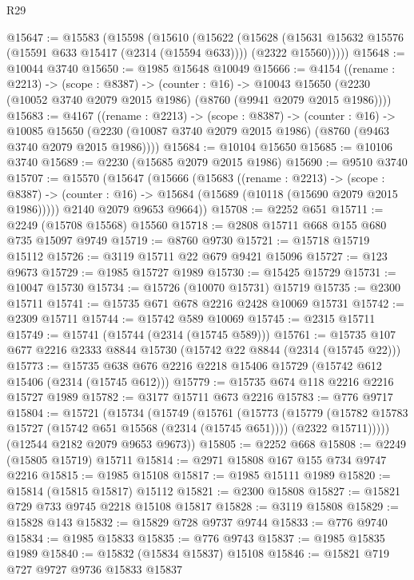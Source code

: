 \begin{lexlean}{R29}
\begin{coremodule}
@15647 := @15583
    (@15598
      (@15610
        (@15622
          (@15628
            (@15631 @15632 @15576 (@15591 @633 @15417 (@2314 (@15594 @633))))
            (@2322 @15560)))))
@15648 := @10044 @3740
@15650 := @1985 @15648 @10049
@15666 := @4154
    ((rename : @2213) ->
    (scope : @8387) ->
    (counter : @16) ->
    @10043 @15650 (@2230 (@10052 @3740 @2079 @2015 @1986) (@8760 (@9941 @2079 @2015 @1986))))
@15683 := @4167
    ((rename : @2213) ->
    (scope : @8387) ->
    (counter : @16) ->
    @10085 @15650 (@2230 (@10087 @3740 @2079 @2015 @1986) (@8760 (@9463 @3740 @2079 @2015 @1986))))
@15684 := @10104 @15650
@15685 := @10106 @3740
@15689 := @2230 (@15685 @2079 @2015 @1986)
@15690 := @9510 @3740
@15707 := @15570
    (@15647
      (@15666
        (@15683
          ((rename : @2213) ->
          (scope : @8387) ->
          (counter : @16) -> @15684 (@15689 (@10118 (@15690 @2079 @2015 @1986)))))
        @2140
        @2079
        @9653
        @9664))
@15708 := @2252 @651
@15711 := @2249 (@15708 @15568) @15560
@15718 := @2808 @15711 @668 @155 @680 @735 @15097 @9749
@15719 := @8760 @9730
@15721 := @15718 @15719 @15112
@15726 := @3119 @15711 @22 @679 @9421 @15096
@15727 := @123 @9673
@15729 := @1985 @15727 @1989
@15730 := @15425 @15729
@15731 := @10047 @15730
@15734 := @15726 (@10070 @15731) @15719
@15735 := @2300 @15711
@15741 := @15735 @671 @678 @2216 @2428 @10069 @15731
@15742 := @2309 @15711
@15744 := @15742 @589 @10069
@15745 := @2315 @15711
@15749 := @15741 (@15744 (@2314 (@15745 @589)))
@15761 := @15735 @107 @677 @2216 @2333 @8844 @15730 (@15742 @22 @8844 (@2314 (@15745 @22)))
@15773 := @15735 @638 @676 @2216 @2218 @15406 @15729 (@15742 @612 @15406 (@2314 (@15745 @612)))
@15779 := @15735 @674 @118 @2216 @2216 @15727 @1989
@15782 := @3177 @15711 @673 @2216
@15783 := @776 @9717
@15804 := @15721
    (@15734
      (@15749
        (@15761
          (@15773
            (@15779
              (@15782 @15783 @15727 (@15742 @651 @15568 (@2314 (@15745 @651))))
              (@2322 @15711)))))
      (@12544 @2182 @2079 @9653 @9673))
@15805 := @2252 @668
@15808 := @2249 (@15805 @15719) @15711
@15814 := @2971 @15808 @167 @155 @734 @9747 @2216
@15815 := @1985 @15108
@15817 := @1985 @15111 @1989
@15820 := @15814 (@15815 @15817) @15112
@15821 := @2300 @15808
@15827 := @15821 @729 @733 @9745 @2218 @15108 @15817
@15828 := @3119 @15808
@15829 := @15828 @143
@15832 := @15829 @728 @9737 @9744
@15833 := @776 @9740
@15834 := @1985 @15833
@15835 := @776 @9743
@15837 := @1985 @15835 @1989
@15840 := @15832 (@15834 @15837) @15108
@15846 := @15821 @719 @727 @9727 @9736 @15833 @15837

\end{coremodule}
\end{lexlean}
